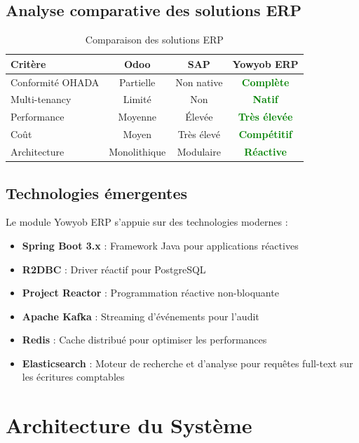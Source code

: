 \documentclass[12pt]{report}
\begin{document}
\section{Analyse comparative des solutions ERP}
\begin{table}[H]
\centering
\begin{tabular}{|l|c|c|c|}
\hline
\textbf{Critère} & \textbf{Odoo} & \textbf{SAP} & \textbf{Yowyob ERP} \\ \hline
Conformité OHADA & Partielle & Non native & \textcolor{green}{\textbf{Complète}} \\ \hline
Multi-tenancy & Limité & Non & \textcolor{green}{\textbf{Natif}} \\ \hline
Performance & Moyenne & Élevée & \textcolor{green}{\textbf{Très élevée}} \\ \hline
Coût & Moyen & Très élevé & \textcolor{green}{\textbf{Compétitif}} \\ \hline
Architecture & Monolithique & Modulaire & \textcolor{green}{\textbf{Réactive}} \\ \hline
\end{tabular}
\caption{Comparaison des solutions ERP}
\label{tab:comparaison}
\end{table}

\section{Technologies émergentes}
Le module Yowyob ERP s'appuie sur des technologies modernes :
\begin{itemize}
    \item \textbf{Spring Boot 3.x} : Framework Java pour applications réactives
    \item \textbf{R2DBC} : Driver réactif pour PostgreSQL
    \item \textbf{Project Reactor} : Programmation réactive non-bloquante
    \item \textbf{Apache Kafka} : Streaming d'événements pour l'audit
    \item \textbf{Redis} : Cache distribué pour optimiser les performances
    \item \textbf{Elasticsearch} : Moteur de recherche et d'analyse pour requêtes full-text sur les écritures comptables
\end{itemize}

\chapter{Architecture du Système}
\end{document}
